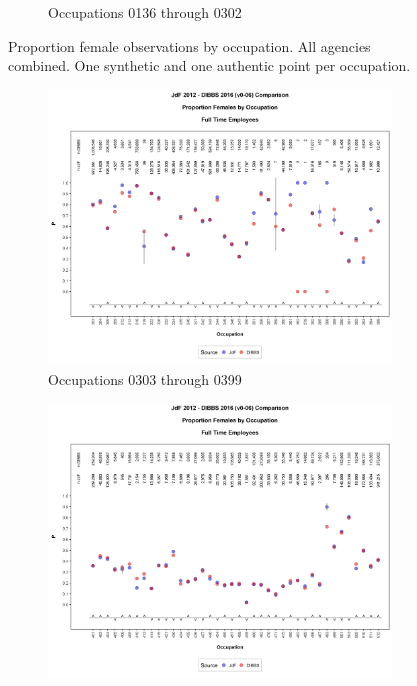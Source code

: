 \documentclass[10pt, letterpaper]{article}
\begin{document}
\begin{spacing}{1.0}
\begin{figure}[h]
\begin{subfigure}{1\textwidth}
        \caption{Occupations 0136 through 0302}
        \vspace{10pt}
    \end{subfigure}
    \caption{Proportion female observations by occupation.  All agencies combined.  One synthetic and one authentic point per occupation.}
    \label{figure:JdFDIBBSOccupationProportionBar1}
\end{figure}

\clearpage

\begin{figure}[h]
    \centering
    \begin{subfigure}{1\textwidth}
        \centering
        \includegraphics[width=6in, trim={0 1in 0 1in}, clip]{JdFDIBBSOccupationProportionBar81.png}
        \caption{Occupations 0303 through 0399}
        \vspace{10pt}
    \end{subfigure}
    \begin{subfigure}{1\textwidth}
        \centering
        \includegraphics[width=6in, trim={0 1in 0 1in}, clip]{JdFDIBBSOccupationProportionBar121.png}

\end{subfigure}
\end{figure}
\end{spacing}
\end{document}
